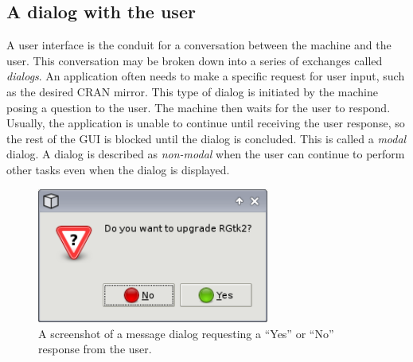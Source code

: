 \documentclass[article,shortnames]{jss}
\begin{document}
\subsection{A dialog with the user}\label{sec:dialog-example}

A user interface is the conduit for a conversation between the machine
and the user. This conversation may be broken down into a series of
exchanges called \emph{dialogs}. An application often needs to make a
specific request for user input, such as the desired CRAN mirror. This
type of dialog is initiated by the machine posing a question to the
user. The machine then waits for the user to respond. Usually, the
application is unable to continue until receiving the user response,
so the rest of the GUI is blocked until the dialog is concluded. This
is called a \emph{modal} dialog.  A dialog is described as
\emph{non-modal} when the user can continue to perform other tasks
even when the dialog is displayed.

\begin{figure}[tbp]
  \begin{center}
    \includegraphics[width=3in]{upgrade-dialog.png}
    \caption{\label{fig:upgrade-dialog}A screenshot of a message
dialog
      requesting a 
      ``Yes'' or ``No'' response from the user.}
  \end{center}
\end{figure}
\end{document}
